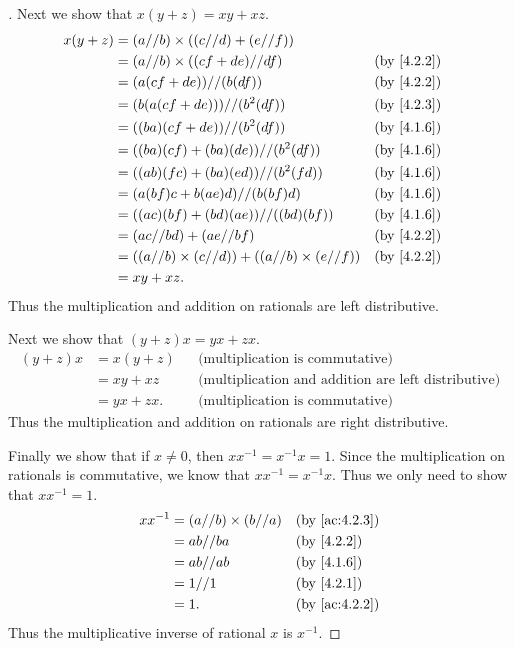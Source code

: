 \begin{proof}[]
  Next we show that \(x(y + z) = xy + xz\).
  \begin{align*}
    x(y + z) & = (a // b) \times ((c // d) + (e // f))                                   \\
             & = (a // b) \times ((cf + de) // df)                       &  & \by{4.2.2} \\
             & = (a(cf + de)) // (b(df))                                 &  & \by{4.2.2} \\
             & = (b(a(cf + de))) // (b^2(df))                            &  & \by{4.2.3} \\
             & = ((ba)(cf + de)) // (b^2(df))                            &  & \by{4.1.6} \\
             & = ((ba)(cf) + (ba)(de)) // (b^2(df))                      &  & \by{4.1.6} \\
             & = ((ab)(fc) + (ba)(ed)) // (b^2(fd))                      &  & \by{4.1.6} \\
             & = (a(bf)c + b(ae)d) // (b(bf)d)                           &  & \by{4.1.6} \\
             & = ((ac)(bf) + (bd)(ae)) // ((bd)(bf))                     &  & \by{4.1.6} \\
             & = (ac // bd) + (ae // bf)                                 &  & \by{4.2.2} \\
             & = ((a // b) \times (c // d)) + ((a // b) \times (e // f)) &  & \by{4.2.2} \\
             & = xy + xz.
  \end{align*}
  Thus the multiplication and addition on rationals are left distributive.

  Next we show that \((y + z)x = yx + zx\).
  \begin{align*}
    (y + z)x & = x(y + z) &  & \text{(multiplication is commutative)}                     \\
             & = xy + xz  &  & \text{(multiplication and addition are left distributive)} \\
             & = yx + zx. &  & \text{(multiplication is commutative)}
  \end{align*}
  Thus the multiplication and addition on rationals are right distributive.

  Finally we show that if \(x \neq 0\), then \(xx^{-1} = x^{-1}x = 1\).
  Since the multiplication on rationals is commutative, we know that \(xx^{-1} = x^{-1}x\).
  Thus we only need to show that \(xx^{-1} = 1\).
  \begin{align*}
    xx^{-1} & = (a // b) \times (b // a) &  & \by{ac:4.2.3} \\
            & = ab // ba                 &  & \by{4.2.2}    \\
            & = ab // ab                 &  & \by{4.1.6}    \\
            & = 1 // 1                   &  & \by{4.2.1}    \\
            & = 1.                       &  & \by{ac:4.2.2}
  \end{align*}
  Thus the multiplicative inverse of rational \(x\) is \(x^{-1}\).
\end{proof}

